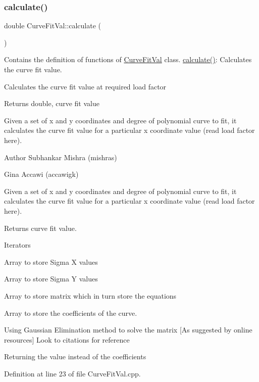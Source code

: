 \subsubsection{\texorpdfstring{calculate()}{calculate()}\hspace{0.1cm}{\footnotesize\ttfamily [1/3]}}
{\footnotesize\ttfamily double Curve\+Fit\+Val\+::calculate (\begin{DoxyParamCaption}{ }\end{DoxyParamCaption})}



Contains the definition of functions of \hyperlink{class_curve_fit_val}{Curve\+Fit\+Val} class. \hyperlink{class_curve_fit_val_ab4692d5c52b77dc03caf7b45f6377ba8}{calculate()}\+: Calculates the curve fit value. 

Calculates the curve fit value at required load factor \begin{DoxyReturn}{Returns}
double, curve fit value
\end{DoxyReturn}
Given a set of x and y coordinates and degree of polynomial curve to fit, it calculates the curve fit value for a particular x coordinate value (read load factor here).

\begin{DoxyAuthor}{Author}
Subhankar Mishra (mishras) 

Gina Accawi (accawigk) 
\end{DoxyAuthor}
Given a set of x and y coordinates and degree of polynomial curve to fit, it calculates the curve fit value for a particular x coordinate value (read load factor here). \begin{DoxyReturn}{Returns}
curve fit value. 
\end{DoxyReturn}
Iterators

Array to store Sigma X values

Array to store Sigma Y values

Array to store matrix which in turn store the equations

Array to store the coefficients of the curve.

Using Gaussian Elimination method to solve the matrix \mbox{[}As suggested by online resources\mbox{]} Look to citations for reference

Returning the value instead of the coefficients

Definition at line 23 of file Curve\+Fit\+Val.\+cpp.

\mbox{\label{class_curve_fit_val_ab4692d5c52b77dc03caf7b45f6377ba8}} 
